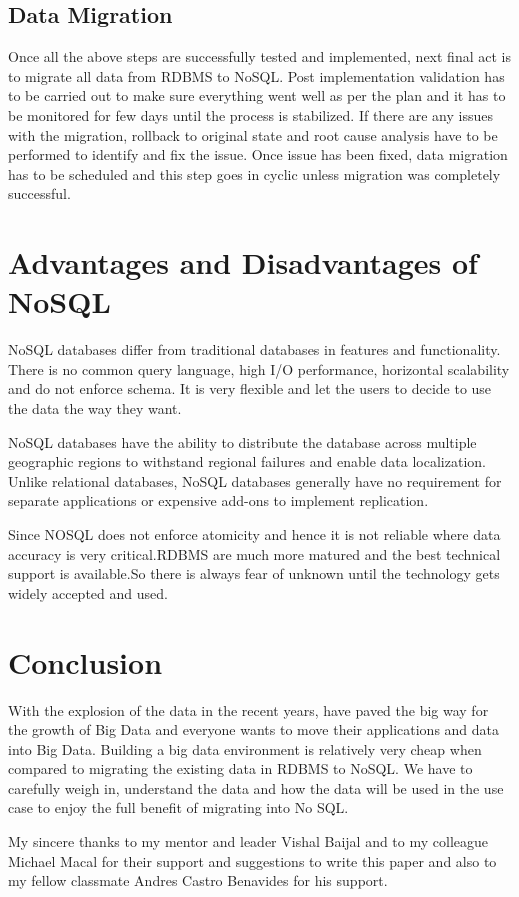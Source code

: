 \documentclass[sigconf]{acmart}
\begin{document}
\subsection{Data Migration} 
Once all the above steps are successfully tested and implemented, next final act is to migrate all data from RDBMS to NoSQL. Post implementation validation has to be carried out to make sure everything went well as per the plan and it has to be monitored for few days until the process is stabilized. If there are any issues with the migration, rollback to original state and root cause analysis have to be performed to identify and fix the issue. Once issue has been fixed, data migration has to be scheduled and this step goes in cyclic unless migration was completely successful. 

\section{Advantages and Disadvantages of NoSQL}
NoSQL databases differ from traditional databases in features and functionality. There is no common query language, high I/O performance, horizontal scalability and do not enforce schema. It is very flexible and let the users to decide to use the data the way they want.

NoSQL databases have the ability to distribute the database across multiple geographic regions to withstand regional failures and enable data localization. Unlike relational databases, NoSQL databases generally have no requirement for separate applications or expensive add-ons to implement replication. \cite{mongo}

Since NOSQL does not enforce atomicity and hence it is not reliable where data accuracy is very critical.RDBMS are much more matured and the best technical support is available.So there is always fear of unknown until the technology gets widely accepted and used.

\section{Conclusion}

With the explosion of the data in the recent years, have paved the big way for the growth of Big Data and everyone wants to move their applications and data into Big Data. Building a big data environment is relatively very cheap when compared to migrating the existing data in RDBMS to NoSQL. We have to carefully weigh in, understand the data and how the data will be used in the use case to enjoy the full benefit of migrating into No SQL.


\begin{acks}

My sincere thanks to my mentor and leader Vishal Baijal and to my colleague Michael Macal for their support and suggestions to write this paper and also to my fellow classmate Andres Castro Benavides for his support.

\end{acks}


 
\end{document}
